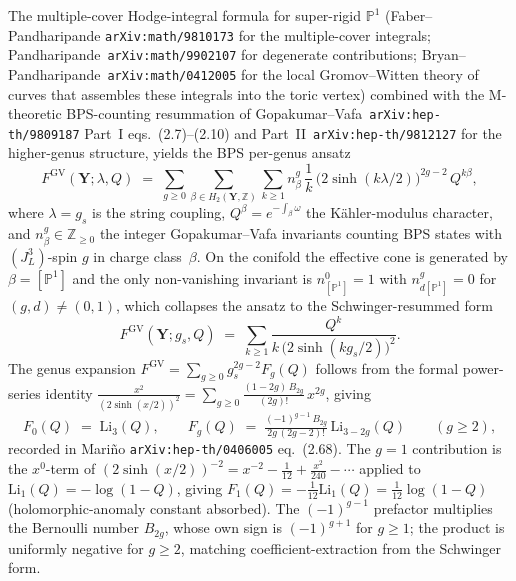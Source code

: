 \documentclass[11pt]{amsart}
\theoremstyle{definition}
\providecommand{\bY}{\mathbf{Y}}
\providecommand{\bZ}{\mathbb{Z}}
\providecommand{\bP}{\mathbb{P}}
\begin{document}
The multiple-cover Hodge-integral formula for super-rigid $\bP^1$
(Faber--Pandharipande \texttt{arXiv:math/9810173} for the multiple-cover
integrals; Pandharipande~\texttt{arXiv:math/9902107} for degenerate
contributions; Bryan--Pandharipande~\texttt{arXiv:math/0412005} for the
local Gromov--Witten theory of curves that assembles these integrals
into the toric vertex) combined with the M-theoretic BPS-counting
resummation of Gopakumar--Vafa~\texttt{arXiv:hep-th/9809187} Part~I
eqs.~(2.7)--(2.10) and Part~II~\texttt{arXiv:hep-th/9812127} for the
higher-genus structure, yields the BPS per-genus ansatz
\[
  F^{\mathrm{GV}}(\bY;\lambda,Q)
  \;=\;
  \sum_{g\ge 0}\sum_{\beta\in H_2(\bY,\bZ)}\sum_{k\ge 1}
    n^{g}_{\beta}\,\frac{1}{k}\,
    \bigl(2\sinh(k\lambda/2)\bigr)^{2g-2}\,
    Q^{k\beta},
\]
where $\lambda = g_s$ is the string coupling, $Q^\beta = e^{-\int_\beta
\omega}$ the Kähler-modulus character, and $n^g_\beta \in \bZ_{\ge 0}$
the integer Gopakumar--Vafa invariants counting BPS states with
$(J^3_L)$-spin $g$ in charge class~$\beta$. On the conifold the effective
cone is generated by $\beta = [\bP^1]$ and the only non-vanishing
invariant is $n^{0}_{[\bP^1]} = 1$ with $n^{g}_{d[\bP^1]} = 0$ for
$(g,d) \neq (0,1)$, which collapses the ansatz to the
Schwinger-resummed form
\[
  F^{\mathrm{GV}}(\bY; g_s, Q)
  \;=\;
  \sum_{k \geq 1}
    \frac{Q^{k}}{k\,\bigl(2\sinh(k g_s/2)\bigr)^{2}}.
\]
The genus expansion $F^{\mathrm{GV}} = \sum_{g \geq 0}
g_s^{2g-2} F_g(Q)$ follows from the formal power-series identity
$\frac{x^{2}}{(2\sinh(x/2))^{2}} = \sum_{g \geq 0}
\tfrac{(1-2g)\,B_{2g}}{(2g)!}\,x^{2g}$, giving
\[
  F_{0}(Q) \;=\; \mathrm{Li}_{3}(Q),
  \qquad
  F_{g}(Q) \;=\; \tfrac{(-1)^{g-1}\,B_{2g}}{2g\,(2g-2)!}\,
                \mathrm{Li}_{3-2g}(Q)
  \qquad (g \geq 2),
\]
recorded in Mariño \texttt{arXiv:hep-th/0406005} eq.~(2.68). The
$g = 1$ contribution is the $x^{0}$-term of
$(2\sinh(x/2))^{-2} = x^{-2} - \tfrac{1}{12} + \tfrac{x^{2}}{240} - \cdots$
applied to $\mathrm{Li}_{1}(Q) = -\log(1 - Q)$, giving
$F_{1}(Q) = -\tfrac{1}{12}\mathrm{Li}_{1}(Q) = \tfrac{1}{12}\log(1 - Q)$
(holomorphic-anomaly constant absorbed). The
$(-1)^{g-1}$ prefactor multiplies the Bernoulli number $B_{2g}$, whose
own sign is $(-1)^{g+1}$ for $g \geq 1$; the product is uniformly
negative for $g \geq 2$, matching coefficient-extraction from the
Schwinger form.
\end{document}
